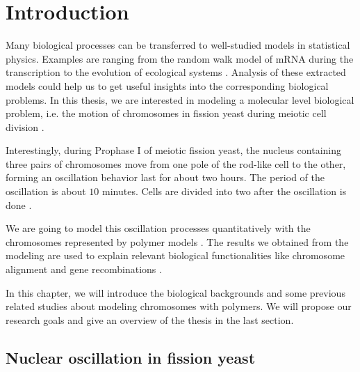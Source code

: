 
\chapter{Introduction}  %
\graphicspath{{Chapter1/Figs/}}


Many biological processes can be transferred to well-studied models in statistical physics. Examples are ranging from the random walk model of mRNA during the transcription \cite{Macdonald1968,Bressloff2013,Chou2011} to the evolution of ecological systems \cite{Berryman1992,Butler2009,Sugihara2012,Williams2016a}. Analysis of these extracted models could help us to get useful insights into the corresponding biological problems. In this thesis, we are interested in modeling a molecular level biological problem, i.e. the motion of chromosomes in fission yeast during meiotic cell division \cite{Chikashige1994,Vogel2009,Shibuya2014}.

Interestingly, during Prophase I of meiotic fission yeast, the nucleus containing three pairs of chromosomes move from one pole of the rod-like cell to the other, forming an oscillation behavior last for about two hours. The period of the oscillation is about $10$ minutes. Cells are divided into two after the oscillation is done \cite{Yamamoto2001,Ding2004,Gerton2005}.

We are going to model this oscillation processes quantitatively with the chromosomes represented by polymer models \cite{DeGennes1979,Doi1988}. The results we obtained from the modeling are used to explain relevant biological functionalities like chromosome alignment and gene recombinations \cite{Lin2015}. 

In this chapter, we will introduce the biological backgrounds and some previous related studies about modeling chromosomes with polymers. We will propose our research goals and give an overview of the thesis in the last section. 


\section{Nuclear oscillation in fission yeast} %
\label{sec:nuclear_oscillation_in_fission_yeast}

